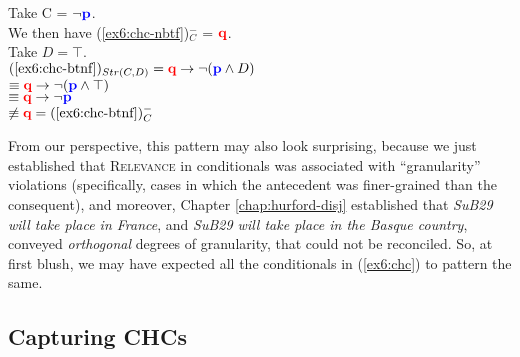 \begin{exe}
\begin{xlist}
{				Take C = $\neg\textbf{\textcolor{blue}{p}}$.\\
				We then have (\ref{ex6:chc-nbtf})$^-_C$ = $\textbf{\textcolor{red}{q}}$.\\
				Take $D=\top$.\\
				$(\textref{ex6:chc-btnf})_{Str(C, D)} = \q \rightarrow \neg(\p \wedge D)$\\
				 $\equiv \textbf{\textcolor{red}{q}} \rightarrow \neg(\textbf{\textcolor{blue}{p}} \wedge \top)$\\
				 $\equiv \textbf{\textcolor{red}{q}} \rightarrow \neg \textbf{\textcolor{blue}{p}}$\\
				 $\not\equiv \q = (\textref{ex6:chc-btnf})^-_C$}\label{ex6:chc-btnf-sr}
		\end{xlist}
\end{exe}


From our perspective, this pattern may also look surprising, because we just established that \textsc{Relevance} in conditionals was associated with ``granularity'' violations (specifically, cases in which the antecedent was finer-grained than the consequent), and moreover, Chapter \ref{chap:hurford-disj} established that \textit{SuB29 will take place in France}, and \textit{SuB29 will take place in the Basque country}, conveyed \textit{orthogonal} degrees of granularity, that could not be reconciled. So, at first blush, we may have expected all the conditionals in (\ref{ex6:chc}) to pattern the same.

\subsection{Capturing CHCs}

